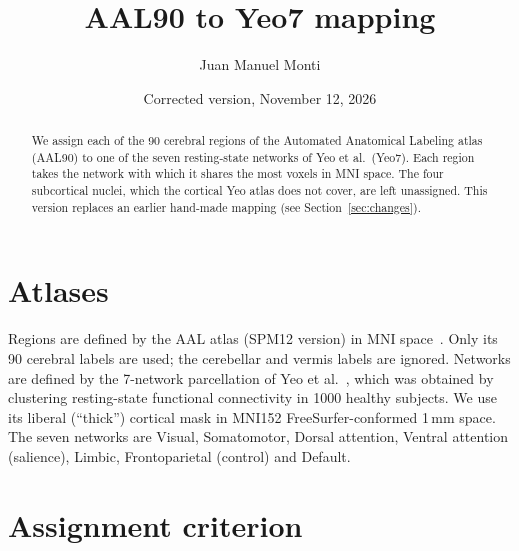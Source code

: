 \documentclass[a4paper,10pt]{article}
\title{AAL90 to Yeo7 mapping}
\author{Juan Manuel Monti}
\date{Corrected version, November 12, 2026}
\begin{document}
\maketitle

\begin{abstract}
We assign each of the 90 cerebral regions of the Automated Anatomical Labeling atlas (AAL90) to one of the seven resting-state networks of Yeo et al.\ (Yeo7).
Each region takes the network with which it shares the most voxels in MNI space.
The four subcortical nuclei, which the cortical Yeo atlas does not cover, are left unassigned.
This version replaces an earlier hand-made mapping (see Section~\ref{sec:changes}).
\end{abstract}

\section*{Atlases}

Regions are defined by the AAL atlas (SPM12 version) in MNI space~\cite{tzourio2002}.
Only its 90 cerebral labels are used; the cerebellar and vermis labels are ignored.
Networks are defined by the 7-network parcellation of Yeo et al.~\cite{yeo2011}, which was obtained by clustering resting-state functional connectivity in 1000 healthy subjects.
We use its liberal (``thick'') cortical mask in MNI152 FreeSurfer-conformed 1\,mm space.
The seven networks are Visual, Somatomotor, Dorsal attention, Ventral attention (salience), Limbic, Frontoparietal (control) and Default.

\section*{Assignment criterion}
\end{document}
